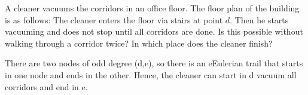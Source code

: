 A cleaner vacuums the corridors in an office floor. The floor plan of the building is as follows:
The cleaner enters the floor via stairs at point $d$. Then he starts vacuuming and does not stop until all corridors are done. Is this possible without walking through a corridor twice? In which place does the cleaner finish? 

\solution
There are two nodes of odd degree (d,e), so there is an eEulerian trail that starts in one node and ends in the other. Hence, the cleaner can start in d vacuum all corridors and end in e.  